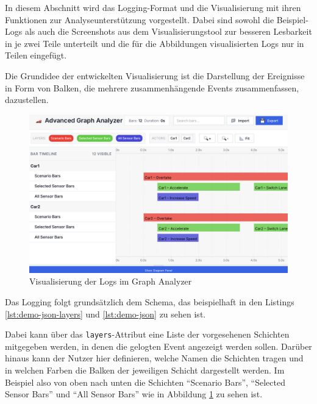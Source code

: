 In diesem Abschnitt wird das Logging-Format und die Visualisierung mit ihren Funktionen zur Analyseunterstützung vorgestellt. Dabei sind sowohl die Beispiel-Logs als auch die Screenshots aus dem Visualisierungstool zur besseren Lesbarkeit in je zwei Teile unterteilt und die für die Abbildungen visualisierten Logs nur in Teilen eingefügt.

Die Grundidee der entwickelten Visualisierung ist die Darstellung der Ereignisse in Form von Balken, die mehrere zusammenhängende Events zusammenfassen, dazustellen.

\begin{figure}[htb]
    \centering
    \includegraphics[width=\textwidth]{contents/figures/graph_analyzer.png}
    \caption{Visualisierung der Logs im Graph Analyzer}
    \label{fig:analyzer_graph}
\end{figure}

Das Logging folgt grundsätzlich dem Schema, das beispielhaft in den Listings \ref{lst:demo-json-layers} und \ref{lst:demo-json} zu sehen ist.



Dabei kann über das \texttt{layers}-Attribut eine Liste der vorgesehenen Schichten mitgegeben werden, in denen die gelogten Event angezeigt werden sollen. Darüber hinaus kann der Nutzer hier definieren, welche Namen die Schichten tragen und in welchen Farben die Balken der jeweiligen Schicht dargestellt werden. Im Beispiel also von oben nach unten die Schichten \enquote{Scenario Bars}, \enquote{Selected Sensor Bars} und \enquote{All Sensor Bars} wie in Abbildung \ref{fig:analyzer_graph} zu sehen ist.



